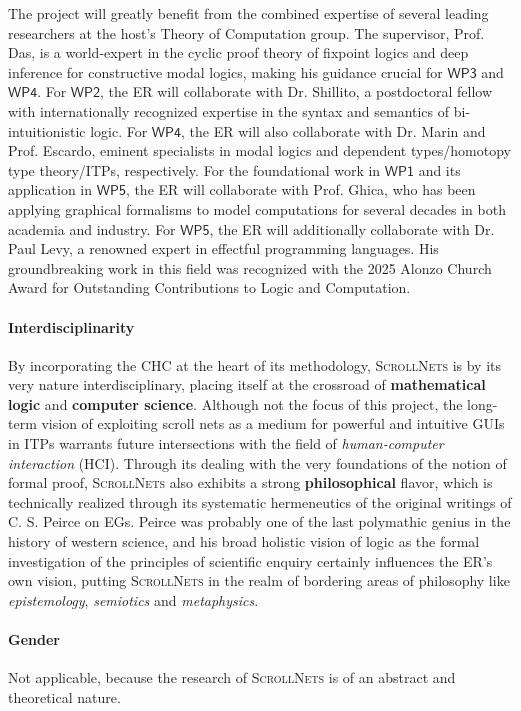 \documentclass[12pt,draftproposal]{msca-pf}
\newcommand{\proj}{\small\textsc{ScrollNets}}
\newcommand{\WP}[1]{$\mathsf{WP#1}$}
\begin{document}
The project will greatly benefit from the combined expertise of several leading researchers at the
host's Theory of Computation group. The supervisor, Prof. Das, is a world-expert in the cyclic proof
theory of fixpoint logics and deep inference for constructive modal logics, making his guidance
crucial for \WP{3} and \WP{4}. For \WP{2}, the ER will collaborate with Dr. Shillito, a postdoctoral
fellow with internationally recognized expertise in the syntax and semantics of bi-intuitionistic
logic. For \WP{4}, the ER will also collaborate with Dr. Marin and Prof. Escardo, eminent
specialists in modal logics and dependent types/homotopy type theory/ITPs, respectively. For the
foundational work in \WP{1} and its application in \WP{5}, the ER will collaborate with Prof. Ghica,
who has been applying graphical formalisms to model computations for several decades in both
academia and industry. For \WP{5}, the ER will additionally collaborate with Dr. Paul Levy, a
renowned expert in effectful programming languages. His groundbreaking work in this field was
recognized with the 2025 Alonzo Church Award for Outstanding Contributions to Logic and Computation.

\paragraph{Interdisciplinarity} By incorporating the CHC at the heart of its methodology, {\proj} is
by its very nature interdisciplinary, placing itself at the crossroad of \textbf{mathematical logic}
and \textbf{computer science}. Although not the focus of this project, the long-term vision of
exploiting scroll nets as a medium for powerful and intuitive GUIs in ITPs warrants future
intersections with the field of \emph{human-computer interaction} (HCI). Through its dealing with
the very foundations of the notion of formal proof, {\proj} also exhibits a strong
\textbf{philosophical} flavor, which is technically realized through its systematic hermeneutics of
the original writings of C. S. Peirce on EGs. Peirce was probably one of the last polymathic genius
in the history of western science, and his broad holistic vision of logic as the formal
investigation of the principles of scientific enquiry certainly influences the ER's own vision,
putting {\proj} in the realm of bordering areas of philosophy like \emph{epistemology},
\emph{semiotics} and \emph{metaphysics}.

\paragraph{Gender}
Not applicable, because the research of {\proj} is of an abstract and theoretical nature.
\end{document}
